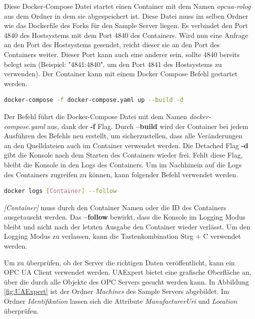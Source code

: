 \documentclass[a4paper, 12pt, oneside, toc=listofnumbered, bibliography=totoc]{scrbook}
\begin{document}
		Diese Docker-Compose Datei startet einen Container mit dem Namen \textit{opcua-rolog} aus dem Ordner in dem sie abgespeichert ist. Diese Datei muss im selben Ordner wie das Dockerfile des Forks für den Sample Server liegen. Es verbindet den Port 4840 des Hostsystems mit dem Port 4840 des Containers. Wird nun eine Anfrage an den Port des Hostsystems gesendet, reicht dieser sie an den Port des Containers weiter. Dieser Port kann auch eine anderer sein, sollte 4840 bereits belegt sein (Beispiel: "4841:4840", um den Port 4841 des Hostsystems zu verwenden). Der Container kann mit einem Docker Compose Befehl gestartet werden. 
	
		\begin{lstlisting}[numbers=none, language=bash, frame=single]
			docker-compose -f docker-compose.yaml up --build -d
		\end{lstlisting}
	
		Der Befehl führt die Docker-Compose Datei mit dem Namen \textit{docker-compose.yaml} aus, dank der \textbf{-f} Flag. Durch \textbf{--build} wird der Container bei jedem Ausführen des Befehls neu erstellt, um sicherzustellen, dass alle Veränderungen an den Quelldateien auch im Container verwendet werden. Die Detached Flag \textbf{-d} gibt die Konsole nach dem Starten des Containers wieder frei. Fehlt diese Flag, bleibt die Konsole in den Logs des Containers. Um im Nachhinein auf die Logs des Containers zugreifen zu können, kann folgender Befehl verwendet werden. 
		
		\begin{lstlisting}[numbers=none, language=bash, frame=single]
			docker logs [Container] --follow
		\end{lstlisting}
		
		\textit{[Container]} muss durch den Container Namen oder die ID des Containers ausgetauscht werden. Das \textbf{--follow} bewirkt, dass die Konsole im Logging Modus bleibt und nicht nach der letzten Ausgabe den Container wieder verlässt. Um den Logging Modus zu verlassen, kann die Tastenkombination Strg + C verwendet werden.
		
		Um zu überprüfen, ob der Server die richtigen Daten veröffentlicht, kann ein OPC UA Client verwendet werden. UAExpert bietet eine grafische Oberfläche an, über die durch alle Objekte des OPC Servers gesucht werden kann. In Abbildung \ref{fig:UAExpert} ist der Ordner \textit{Machines} des Sample Servers abgebildet. Im Ordner \textit{Identifikation} lassen sich die Attribute \textit{ManufacturerUri} und \textit{Location} überprüfen.
		
\end{document}
